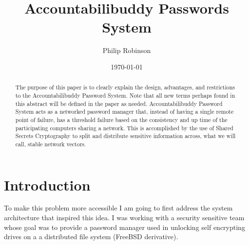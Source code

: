 \documentclass[11pt]{article} %
\title{Accountabilibuddy Passwords System}
\date{\today}
\author{Philip Robinson}
\def\aps{Accountabilibuddy Password System\xspace}
\def\ssc{Shared Secrets Cryptography\xspace}
\def\tf{threshold failure\xspace}
\def\snv{stable network vectors\xspace}
\def\pm{password manager\xspace}
\def\npm{networked \pm}
\def\sed{self encrypting drive\xspace}
\def\seds{\sed{s}\xspace}
\def\bsd{FreeBSD\xspace}
\begin{document}
\maketitle
{}
\begin{abstract}
The purpose of this paper is to clearly explain the design, advantages, and restrictions to the \aps. Note that all new terms perhaps found in this abstract will be defined in the paper as needed. \aps acts as a \npm that, instead of having a single remote point of failure, has a \tf based on the consistency and up time of the participating computers sharing a network. This is accomplished by the use of \ssc to split and distribute sensitive information across, what we will call, \snv.

\end{abstract}

\section*{Introduction}
To make this problem more accessible I am going to first address the system architecture that inspired this idea. I was working with a security sensitive team whose goal was to provide a \pm used in unlocking \seds on a a distributed file system (\bsd derivative).
\end{document}
